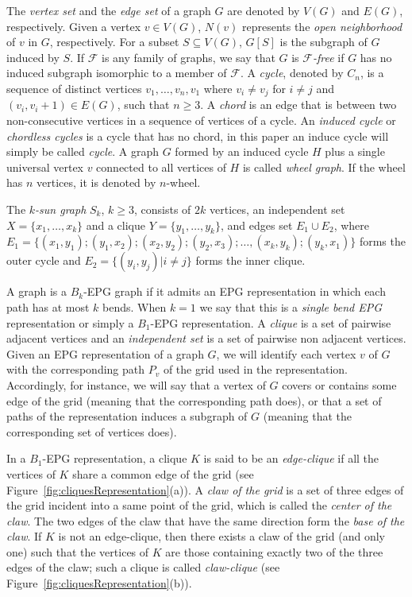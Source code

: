 The \textit{vertex set} and the \textit{edge set} of a graph $G$ are denoted by $V(G)$ and $E(G)$, respectively.  Given a vertex $v\in V(G)$,  $N(v)$ represents the \textit{open 
 neighborhood} of $v$ in $G$, respectively. 
For a subset $S \subseteq V(G)$,  $G[S]$ is the subgraph of $G$ induced by $S$.
 If $\mathcal{F}$ is any family of graphs, we say that  $G$ is  \textit{$\mathcal{F}$-free} if $G$ has no induced subgraph isomorphic to a member of $\mathcal{F}$.
 A \textit{cycle},  denoted by $C_n$,  is a sequence of distinct
vertices $v_1, \dots , v_n, v_1$  where $v_i \neq v_j$ for $i \neq j$ and $(v_i, v_i + 1) \in E(G)$, such that
$n \geq 3$. A \textit{chord} is an edge that is between two non-consecutive vertices in a sequence of vertices of a cycle. An \textit{induced cycle}  or \textit{chordless cycles} is a cycle that has no chord, in this paper an induce cycle will simply be called  \textit{cycle}. A graph $G$ formed by an induced cycle $H$ plus  a single universal vertex $v$ connected to all vertices of $H$
is called \textit{wheel graph}. If the wheel has $n$ vertices, it is denoted by $n$-wheel. 

The $k$\textit{-sun graph }$S_k$, $k \geq 3$, consists of
$2k$ vertices, an independent set $X = \{x_1, \dots, x_k\}$ and a clique $Y = \{y_1, \dots, y_k\}$, and edges set $E_1 \cup E_2$, where $E_ 1=\{ (x_1,y_1); (y_1, x_2); (x_2, y_2); (y_2, x_3); \dots , (x_k, y_k); (y_k, x_1) \}$ forms the outer cycle and $E_2= \{(y_i, y_j) |i\neq j\}$ forms the inner clique.

A graph is a $ B_k$-EPG graph if it admits an EPG representation in which each path has at most $k$ bends.  When $ k = 1 $ we say that this is a \emph{single bend EPG} representation or simply a $B_1$-EPG representation.
A \textit{clique} is a set of pairwise adjacent vertices and
an \textit{independent set} is a set of pairwise non adjacent vertices.
Given an EPG representation of a graph $G$, we will identify each vertex $v$ of $G$ with the corresponding path $P_{v}$ of the grid used in the representation. Accordingly, for instance, we will say that a vertex of $G$ covers or contains some edge of the grid (meaning that the corresponding path does), or that a set of paths of the representation
induces a subgraph of $G$ (meaning that the corresponding set of vertices does). 

In  a $B_1$-EPG representation, a clique $K$  is said to be
 an \textit{edge-clique} if all the vertices of $K$ share a common edge of the grid (see Figure~\ref{fig:cliquesRepresentation}(a)).
 A \textit{claw of the grid} is a set of three edges of the grid incident into a same point of the grid, which is called
  the \textit{center of the claw}. The two edges of the claw that have the same direction form
    the \textit{ base of the claw}. If $K$ is not an edge-clique, then there exists
    a claw of the grid (and only one) such that the vertices of $K$ are those containing exactly two of the three edges of the claw; such a  clique is called  \textit{claw-clique} \cite{golumbic2009} (see Figure~\ref{fig:cliquesRepresentation}(b)).

